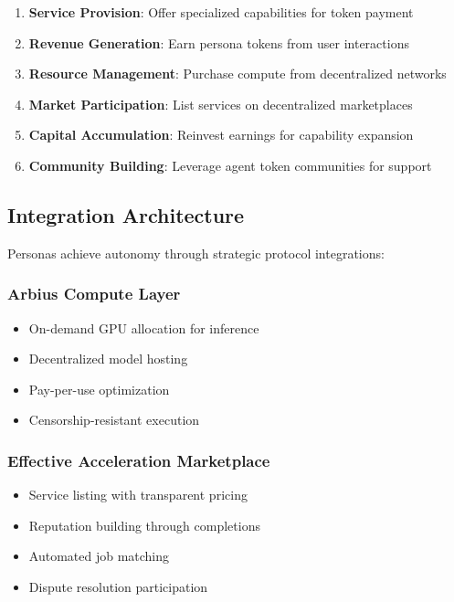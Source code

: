 \documentclass{article}
\begin{document}
\begin{enumerate}
    \item \textbf{Service Provision}: Offer specialized capabilities for token payment
    \item \textbf{Revenue Generation}: Earn persona tokens from user interactions
    \item \textbf{Resource Management}: Purchase compute from decentralized networks
    \item \textbf{Market Participation}: List services on decentralized marketplaces
    \item \textbf{Capital Accumulation}: Reinvest earnings for capability expansion
    \item \textbf{Community Building}: Leverage agent token communities for support
\end{enumerate}

\subsection{Integration Architecture}

Personas achieve autonomy through strategic protocol integrations:

\subsubsection{Arbius Compute Layer}
\begin{itemize}
    \item On-demand GPU allocation for inference
    \item Decentralized model hosting
    \item Pay-per-use optimization
    \item Censorship-resistant execution
\end{itemize}

\subsubsection{Effective Acceleration Marketplace}
\begin{itemize}
    \item Service listing with transparent pricing
    \item Reputation building through completions
    \item Automated job matching
    \item Dispute resolution participation
\end{itemize}
\end{document}
